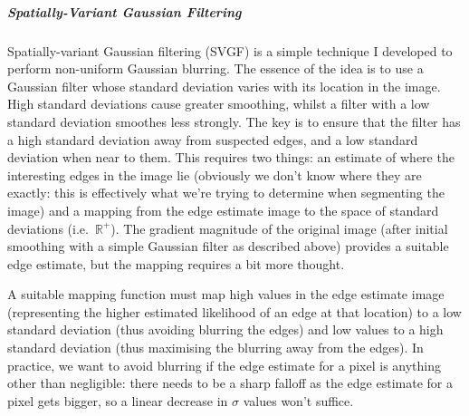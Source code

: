 \subparagraph{Spatially-Variant Gaussian Filtering}

Spatially-variant Gaussian filtering (SVGF) is a simple technique I developed to perform non-uniform Gaussian blurring. The essence of the idea is to use a Gaussian filter whose standard deviation varies with its location in the image. High standard deviations cause greater smoothing, whilst a filter with a low standard deviation smoothes less strongly. The key is to ensure that the filter has a high standard deviation away from suspected edges, and a low standard deviation when near to them. This requires two things: an estimate of where the interesting edges in the image lie (obviously we don't know where they are exactly: this is effectively what we're trying to determine when segmenting the image) and a mapping from the edge estimate image to the space of standard deviations (i.e.~$\mathbb{R}^+$). The gradient magnitude of the original image (after initial smoothing with a simple Gaussian filter as described above) provides a suitable edge estimate, but the mapping requires a bit more thought.

A suitable mapping function must map high values in the edge estimate image (representing the higher estimated likelihood of an edge at that location) to a low standard deviation (thus avoiding blurring the edges) and low values to a high standard deviation (thus maximising the blurring away from the edges). In practice, we want to avoid blurring if the edge estimate for a pixel is anything other than negligible: there needs to be a sharp falloff as the edge estimate for a pixel gets bigger, so a linear decrease in $\sigma$ values won't suffice.

